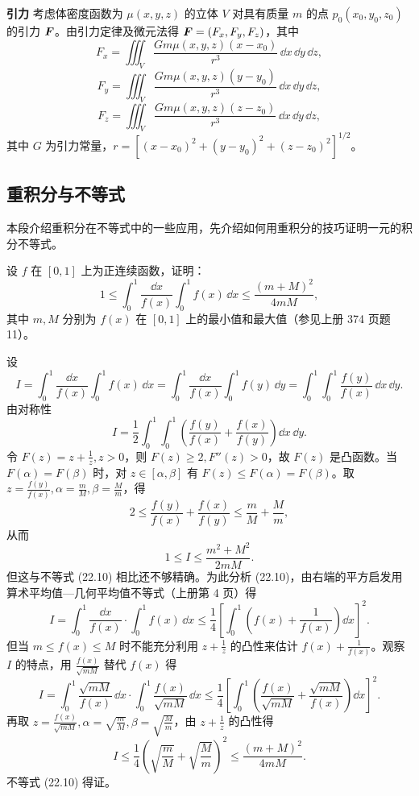 \textbf{引力}
考虑体密度函数为 $\mu(x,y,z)$ 的立体 $V$ 对具有质量 $m$ 的点 $p_0(x_0,y_0,z_0)$ 的引力 $\bm{F}$。由引力定律及微元法得 $\bm{F}=(F_x,F_y,F_z)$，其中
\[
  F_x=\iiint_V\frac{Gm\mu(x,y,z)(x-x_0)}{r^3}\,\dd x\,\dd y\,\dd z,
\]
\[
  F_y=\iiint_V\frac{Gm\mu(x,y,z)(y-y_0)}{r^3}\,\dd x\,\dd y\,\dd z,
\]
\[
  F_z=\iiint_V\frac{Gm\mu(x,y,z)(z-z_0)}{r^3}\,\dd x\,\dd y\,\dd z,
\]
其中 $G$ 为引力常量，$r=[(x-x_0)^2+(y-y_0)^2+(z-z_0)^2]^{1/2}$。

\subsection{重积分与不等式}

本段介绍重积分在不等式中的一些应用，先介绍如何用重积分的技巧证明一元的积分不等式。

\begin{xexample}[22.5.5]
设 $f$ 在 $[0,1]$ 上为正连续函数，证明：
\begin{equation}
  1\le\int_0^1\frac{\dd x}{f(x)}\int_0^1f(x)\,\dd x
  \le\frac{(m+M)^2}{4mM},
  \tag{22.10}
  \label{eq:22.10}
\end{equation}
其中 $m,M$ 分别为 $f(x)$ 在 $[0,1]$ 上的最小值和最大值（参见上册 374 页题 11）。
\end{xexample}
\begin{xproof}
设
\[
  I=\int_0^1\frac{\dd x}{f(x)}\int_0^1f(x)\,\dd x
  =\int_0^1\frac{\dd x}{f(x)}\int_0^1f(y)\,\dd y
  =\int_0^1\int_0^1\frac{f(y)}{f(x)}\,\dd x\,\dd y.
\]
由对称性
\[
  I=\frac12\int_0^1\int_0^1\left(\frac{f(y)}{f(x)}+\frac{f(x)}{f(y)}\right)\dd x\,\dd y.
\]
令 $F(z)=z+\frac1z,z>0$，则 $F(z)\ge2,F''(z)>0$，故 $F(z)$ 是凸函数。当 $F(\alpha)=F(\beta)$ 时，对 $z\in[\alpha,\beta]$ 有 $F(z)\le F(\alpha)=F(\beta)$。取 $z=\frac{f(y)}{f(x)},\alpha=\frac mM,\beta=\frac Mm$，得
\[
  2\le\frac{f(y)}{f(x)}+\frac{f(x)}{f(y)}\le\frac mM+\frac Mm,
\]
从而
\[
  1\le I\le\frac{m^2+M^2}{2mM}.
\]
但这与不等式 (22.10) 相比还不够精确。为此分析 (22.10)，由右端的平方启发用算术平均值—几何平均值不等式（上册第 4 页）得
\begin{equation}
  I=\int_0^1\frac{\dd x}{f(x)}\cdot\int_0^1f(x)\,\dd x
  \le\frac14\left[\int_0^1\left(f(x)+\frac1{f(x)}\right)\dd x\right]^2.
  \tag{22.11}
  \label{eq:22.11}
\end{equation}
但当 $m\le f(x)\le M$ 时不能充分利用 $z+\frac1z$ 的凸性来估计 $f(x)+\frac1{f(x)}$。观察 $I$ 的特点，用 $\frac{f(x)}{\sqrt{mM}}$ 替代 $f(x)$ 得
\[
  I=\int_0^1\frac{\sqrt{mM}}{f(x)}\,\dd x\cdot\int_0^1\frac{f(x)}{\sqrt{mM}}\,\dd x
  \le\frac14\left[\int_0^1\left(\frac{f(x)}{\sqrt{mM}}+\frac{\sqrt{mM}}{f(x)}\right)\dd x\right]^2.
\]
再取 $z=\frac{f(x)}{\sqrt{mM}},\alpha=\sqrt{\frac mM},\beta=\sqrt{\frac Mm}$，由 $z+\frac1z$ 的凸性得
\[
  I\le\frac14\left(\sqrt{\frac mM}+\sqrt{\frac Mm}\right)^2
  \le\frac{(m+M)^2}{4mM}.
\]
不等式 (22.10) 得证。
\end{xproof}

